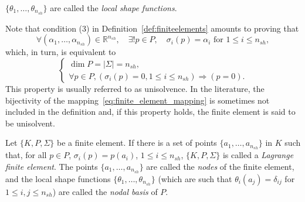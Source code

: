 \begin{definition}
    $\{\theta_1, \dots, \theta_{n_{sh}}\}$ are called the \emph{local shape functions}.
\end{definition}

Note that condition (3) in Definition~\ref{def:finiteelements} amounts to proving that
\begin{equation}
    \forall(\alpha_1, \dots, \alpha_{n_{sh}}) \in \mathbb{R}^{n_{sh}}, \quad \exists ! p \in P, \quad \sigma_i(p) = \alpha_i \text{ for } 1 \le i \le n_{sh},
\end{equation}
which, in turn, is equivalent to
\begin{equation}
    \begin{cases} \dim P = |\Sigma| = n_{sh}, \\ \forall p \in P, (\sigma_i(p) = 0, 1 \le i \le n_{sh}) \Rightarrow (p = 0). \end{cases}
\end{equation}
This property is usually referred to as unisolvence. In the literature, the bijectivity of the mapping~\eqref{eq:finite_element_mapping} is sometimes not included in the definition and, if this property holds, the finite element is said to be unisolvent.

\begin{definition}\label{def:lagrange_finite_element}
    Let $\{K, P, \Sigma\}$ be a finite element. If there is a set of points $\{a_1, \dots, a_{n_{sh}}\}$ in $K$ such that, for all $p \in P$, $\sigma_i(p) = p(a_i)$, $1 \le i \le n_{sh}$, $\{K, P, \Sigma\}$ is called a \emph{Lagrange finite element}. The points $\{a_1, \dots, a_{n_{sh}}\}$ are called the \emph{nodes} of the finite element, and the local shape functions $\{\theta_1, \dots, \theta_{n_{sh}}\}$ (which are such that $\theta_i(a_j) = \delta_{ij}$ for $1 \le i,j \le n_{sh}$) are called the \emph{nodal basis} of $P$.
\end{definition}

